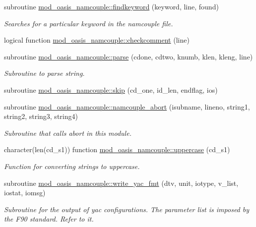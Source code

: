\begin{DoxyCompactItemize}
subroutine \hyperlink{namespacemod__oasis__namcouple_a5f87ffd480c100a94dcdf02f69b23080}{mod\+\_\+oasis\+\_\+namcouple\+::findkeyword} (keyword, line, found)
\begin{DoxyCompactList}\small\item\em Searches for a particular keyword in the namcouple file. \end{DoxyCompactList}\item 
logical function \hyperlink{namespacemod__oasis__namcouple_a4551fbe4bcd69bc6d0d4f6e1ee52ea86}{mod\+\_\+oasis\+\_\+namcouple\+::checkcomment} (line)
\item 
subroutine \hyperlink{namespacemod__oasis__namcouple_a743cf58ab4240aca9ed3e0e2bf1b873c}{mod\+\_\+oasis\+\_\+namcouple\+::parse} (cdone, cdtwo, knumb, klen, kleng, line)
\begin{DoxyCompactList}\small\item\em Subroutine to parse string. \end{DoxyCompactList}\item 
subroutine \hyperlink{namespacemod__oasis__namcouple_a951e3cbd0a1f031399779b6ab3a52112}{mod\+\_\+oasis\+\_\+namcouple\+::skip} (cd\+\_\+one, id\+\_\+len, endflag, ios)
\item 
subroutine \hyperlink{namespacemod__oasis__namcouple_aefebb1d6fd8ac62ea91f9e03265440a3}{mod\+\_\+oasis\+\_\+namcouple\+::namcouple\+\_\+abort} (isubname, lineno, string1, string2, string3, string4)
\begin{DoxyCompactList}\small\item\em Subroutine that calls abort in this module. \end{DoxyCompactList}\item 
character(len(cd\+\_\+s1)) function \hyperlink{namespacemod__oasis__namcouple_a14ea756ea43e135e67ee706e48fbf780}{mod\+\_\+oasis\+\_\+namcouple\+::uppercase} (cd\+\_\+s1)
\begin{DoxyCompactList}\small\item\em Function for converting strings to uppercase. \end{DoxyCompactList}\item 
subroutine \hyperlink{namespacemod__oasis__namcouple_a72b54d7a959dad1e6c65e9381baa48bf}{mod\+\_\+oasis\+\_\+namcouple\+::write\+\_\+yac\+\_\+fmt} (dtv, unit, iotype, v\+\_\+list, iostat, iomsg)
\begin{DoxyCompactList}\small\item\em Subroutine for the output of yac configurations. The parameter list is imposed by the F90 standard. Refer to it. \end{DoxyCompactList}\end{DoxyCompactItemize}
